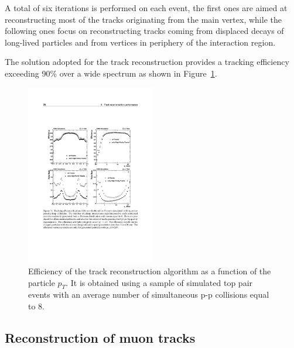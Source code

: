A total of six iterations is performed on each event, the first ones are aimed at reconstructing most of the tracks originating from the main vertex, while the following ones focus on reconstructing tracks coming from displaced decays of long-lived particles and from vertices in periphery of the interaction region.

The solution adopted for the track reconstruction provides a tracking efficiency exceeding 90\% over a wide \pT spectrum as shown in Figure~\ref{fig:tracking_eff}.

\begin{figure}[h!]
\begin{center}
\includegraphics[width=0.5\textwidth]{3_Evt_Reconstruction/pics/trackeff.pdf}
\caption{Efficiency of the track reconstruction algorithm as a function of the particle $p_T$. It is obtained using a sample of simulated top pair events with an average number of simultaneous p-p collisions equal to 8.  
\label{fig:tracking_eff}}
\end{center}
\end{figure}


\subsection{Reconstruction of muon tracks} 

